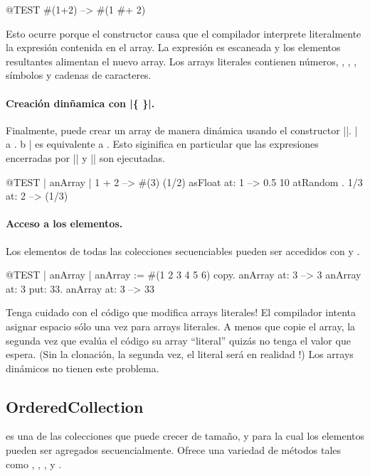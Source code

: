 \documentclass[a4paper,10pt,twoside]{book}
\begin{document}
\begin{code}{@TEST}
#(1+2) -->  #(1 #+ 2)
\end{code}

\noindent
Esto ocurre porque el constructor \ct{#()} causa que el compilador interprete literalmente la expresi\'on contenida en el array. La expresi\'on es escaneada y los elementos resultantes alimentan el nuevo array. Los arrays literales contienen n\'umeros, , , , s\'imbolos y cadenas de caracteres.

\paragraph{Creaci\'on din\~{n}amica con \ct|\{ \}|.}
Finalmente, puede crear un array de manera din\'amica usando el constructor \ct|{}|. \ct|{ a . b }| es equivalente a . Esto siginifica en particular que las expresiones encerradas por \ct|{| y \ct|}| son ejecutadas. 

\begin{code}{@TEST | anArray |}
{ 1 + 2 } --> #(3)
{(1/2) asFloat} at: 1 --> 0.5
{10 atRandom . 1/3} at: 2 --> (1/3)
\end{code}

\paragraph{Acceso a los elementos.}
Los elementos de todas las colecciones secuenciables pueden ser accedidos con  y .

\begin{code}{@TEST | anArray |}
anArray := #(1 2 3 4 5 6) copy.
anArray at: 3 --> 3
anArray at: 3 put: 33.
anArray at: 3 --> 33
\end{code}

\noindent
Tenga cuidado con el c\'odigo que modifica arrays literales!
El compilador intenta asignar espacio s\'olo una vez para arrays literales.
A menos que copie el array, la segunda vez que eval\'ua el c\'odigo su array ``literal'' quiz\'as no tenga el valor que espera.
(Sin la clonaci\'on, la segunda vez, el literal  ser\'a en realidad !)
Los arrays din\'amicos no tienen este problema.

\subsection{OrderedCollection}
 es una de las colecciones que puede crecer de tama\~{n}o, y para la cual los elementos pueden ser agregados secuencialmente. Ofrece una variedad de m\'etodos tales como , , , y . 
\end{document}
